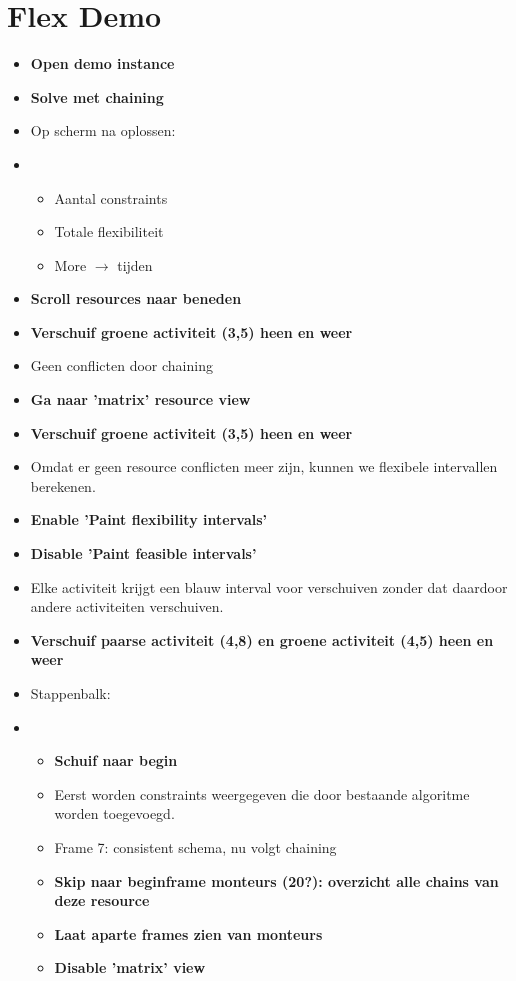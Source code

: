 \documentclass[a4paper]{article}
\begin{document}
\section{Flex Demo}
\begin{itemize}
	\item \textbf{Open demo instance}
	\item \textbf{Solve met chaining}
	\item Op scherm na oplossen:
	\item \begin{itemize}
		\item Aantal constraints
		\item Totale flexibiliteit
		\item More $\rightarrow$ tijden
	\end{itemize}
	\item \textbf{Scroll resources naar beneden}
	\item \textbf{Verschuif groene activiteit (3,5) heen en weer}
	\item Geen conflicten door chaining
	\item \textbf{Ga naar 'matrix' resource view}
	\item \textbf{Verschuif groene activiteit (3,5) heen en weer}
	\item Omdat er geen resource conflicten meer zijn, kunnen we flexibele intervallen berekenen.
	\item \textbf{Enable 'Paint flexibility intervals'}
	\item \textbf{Disable 'Paint feasible intervals'}
	\item Elke activiteit krijgt een blauw interval voor verschuiven zonder dat daardoor andere activiteiten verschuiven.
	\item \textbf{Verschuif paarse activiteit (4,8) en groene activiteit (4,5) heen en weer}
	\item Stappenbalk:
	\item \begin{itemize}
		\item \textbf{Schuif naar begin}
		\item Eerst worden constraints weergegeven die door bestaande algoritme worden toegevoegd.
		\item Frame 7: consistent schema, nu volgt chaining
		\item \textbf{Skip naar beginframe monteurs (20?): overzicht alle chains van deze resource}
		\item \textbf{Laat aparte frames zien van monteurs}
		\item \textbf{Disable 'matrix' view}

\end{itemize}
\end{itemize}
\end{document}
